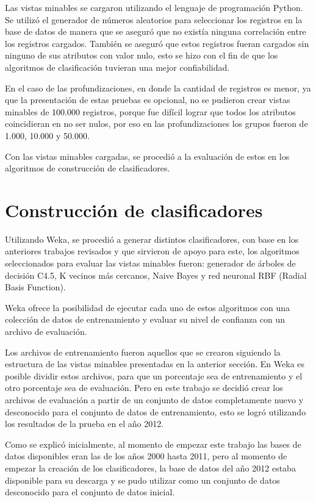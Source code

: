 Las vistas minables se cargaron utilizando el lenguaje de programación Python. Se utilizó el generador de números aleatorios para seleccionar los registros en la base de datos de manera que se aseguró que no existía ninguna correlación entre los registros cargados. También se aseguró que estos registros fueran cargados sin ninguno de sus atributos con valor nulo, esto se hizo con el fin de que los algoritmos de clasificación tuvieran una mejor confiabilidad.

En el caso de las profundizaciones, en donde la cantidad de registros es menor, ya que la presentación de estas pruebas es opcional, no se pudieron crear vistas minables de 100.000 registros, porque fue difícil lograr que todos los atributos coincidieran en no ser nulos, por eso en las profundizaciones los grupos fueron de 1.000, 10.000 y 50.000.

Con las vistas minables cargadas, se procedió a la evaluación de estos en los algoritmos de construcción de clasificadores.
\section{Construcción de clasificadores}
Utilizando Weka, se procedió a generar distintos clasificadores, con base en los anteriores trabajos revisados y que sirvieron de apoyo para este, los algoritmos seleccionados para evaluar las vistas minables fueron: generador de árboles de decisión C4.5\cite{key-170}, K vecinos más cercanos\cite{key-180}, Naive Bayes\cite{key-190} y red neuronal RBF (Radial Basis Function)\cite{key-200}.

Weka ofrece la posibilidad de ejecutar cada uno de estos algoritmos con una colección de datos de entrenamiento y evaluar su nivel de confianza con un archivo de evaluación.

Los archivos de entrenamiento fueron aquellos que se crearon siguiendo la estructura de las vistas minables presentadas en la anterior sección. En Weka es posible dividir estos archivos, para que un porcentaje sea de entrenamiento y el otro porcentaje sea de evaluación. Pero en este trabajo se decidió crear los archivos de evaluación a partir de un conjunto de datos completamente nuevo y desconocido para el conjunto de datos de entrenamiento, esto se logró utilizando los resultados de la prueba en el año 2012. 

Como se explicó inicialmente, al momento de empezar este trabajo las bases de datos disponibles eran las de los años 2000 hasta 2011, pero al momento de empezar la creación de los clasificadores, la base de datos del año 2012 estaba disponible para su descarga y se pudo utilizar como un conjunto de datos desconocido para el conjunto de datos inicial.

